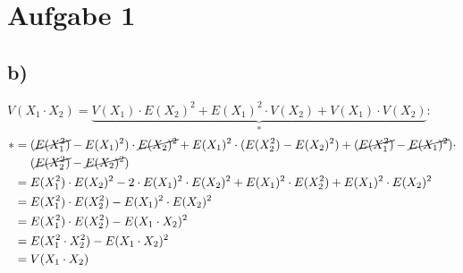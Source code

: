 \section*{Aufgabe 1}
\subsection*{b)}
$ V(X_1\cdot X_2)=\underbrace{V(X_1)\cdot E(X_2)^2 + E(X_1)^2\cdot V(X_2) + V(X_1)\cdot V(X_2)}_* $: \\
\begin{align*}
  * &= (\cancel{E(X_1^2)}- E(X_1)^2)\cdot \cancel{E(X_2)^2} + E(X_1)^2\cdot (E(X_2^2)-E(X_2)^2) + (\cancel{E(X_1^2)}-\cancel{E(X_1)^2})\cdot \\
  &\quad\ (\cancel{E(X_2^2)}-\cancel{E(X_2)^2}) \\
  &=E(X_1^2)\cdot E(X_2)^2 - 2\cdot E(X_1)^2\cdot E(X_2)^2 + E(X_1)^2\cdot E(X_2^2) + E(X_1)^2\cdot E(X_2)^2 \\
  &=E(X_1^2)\cdot E(X_2^2) - E(X_1)^2\cdot E(X_2)^2\\
  &=E(X_1^2)\cdot E(X_2^2) - E(X_1\cdot X_2)^2\\
  &=E(X_1^2\cdot X_2^2) - E(X_1\cdot X_2)^2 \\
  &=V(X_1\cdot X_2)
\end{align*}
